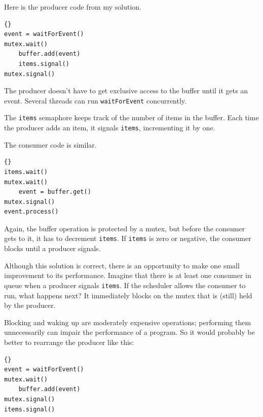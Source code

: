 \documentclass{book}
\begin{document}
Here is the producer code from my solution.

\begin{latin}
\begin{latin}
\begin{lstlisting}[title={Producer solution}]{}
event = waitForEvent()
mutex.wait()
    buffer.add(event)
    items.signal()
mutex.signal()
\end{lstlisting}
\end{latin}
\end{latin}

The producer doesn't have to get exclusive access to the buffer
until it gets an event.  Several threads can run {\tt waitForEvent}
concurrently.

The {\tt items} semaphore keeps track of the
number of items in the buffer.  Each time the producer adds an
item, it signals {\tt items}, incrementing it by one.

The consumer code is similar.

\begin{latin}
\begin{latin}
\begin{lstlisting}[title={Consumer solution}]{}
items.wait()
mutex.wait()
    event = buffer.get()
mutex.signal()
event.process()
\end{lstlisting}
\end{latin}
\end{latin}

Again, the buffer operation is protected by a mutex,
but before the consumer gets to it, it has to decrement
{\tt items}.  If {\tt items} is zero or negative, the
consumer blocks until a producer signals.

Although this solution is correct, there is an opportunity
to make one small improvement to its performance.  Imagine
that there is at least one consumer in queue when a producer
signals {\tt items}.  If the scheduler allows the consumer
to run, what happens next?  It immediately blocks on the
mutex that is (still) held by the producer.

Blocking and waking up are moderately expensive operations;
performing them unnecessarily can impair the performance of
a program.  So it would probably be better to rearrange the
producer like this:

\begin{latin}
\begin{latin}
\begin{lstlisting}[title={Improved producer solution}]{}
event = waitForEvent()
mutex.wait()
    buffer.add(event)
mutex.signal()
items.signal()
\end{lstlisting}
\end{latin}
\end{latin}
\end{document}
